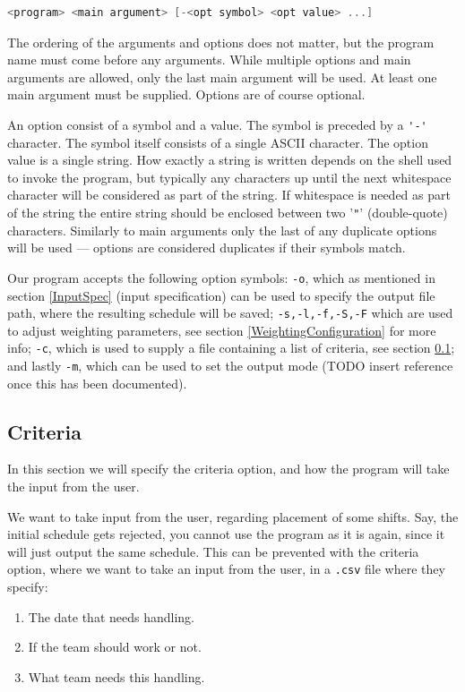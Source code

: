 \begin{lstlisting}[label={lst:OptionSyntax},caption={Syntax description for invocation of the program. Variable parts are marked as following: <variable>. Optional parts are marked as following: {[optional]}. As a shorthand for option, opt is used.},language=C]
<program> <main argument> [-<opt symbol> <opt value> ...]
\end{lstlisting}

The ordering of the arguments and options does not matter, but the program name must come before any arguments. While multiple options and main arguments are allowed, only the last main argument will be used. At least one main argument must be supplied. Options are of course optional.

An option consist of a symbol and a value. The symbol is preceded by a \verb|'-'| character. The symbol itself consists of a single ASCII character. The option value is a single string. How exactly a string is written depends on the shell used to invoke the program, but typically any characters up until the next whitespace character will be considered as part of the string. If whitespace is needed as part of the string the entire string should be enclosed between two '\verb|"|' (double-quote) characters.  Similarly to main arguments only the last of any duplicate options will be used --- options are considered duplicates if their symbols match.

Our program accepts the following option symbols: \verb|-o|, which as mentioned in section \ref{InputSpec} (input specification) can be used to specify the output file path, where the resulting schedule will be saved; \verb|-s,-l,-f,-S,-F| which are used to adjust weighting parameters, see section \ref{WeightingConfiguration} for more info; \verb|-c|, which is used to supply a file containing a list of criteria, see section \ref{CriteriaSpec}; and lastly \verb|-m|, which can be used to set the output mode (TODO insert reference once this has been documented).


\subsection{Criteria}\label{CriteriaSpec}
In this section we will specify the criteria option, and how the program will take the input from the user.

We want to take input from the user, regarding placement of some shifts. Say, the initial schedule gets rejected, you cannot use the program as it is again, since it will just output the same schedule. This can be prevented with the criteria option, where we want to take an input from the user, in a \verb|.csv| file where they specify: 
\begin{enumerate}
    \item The date that needs handling.
    \item If the team should work or not.
    \item What team needs this handling.
\end{enumerate}  

